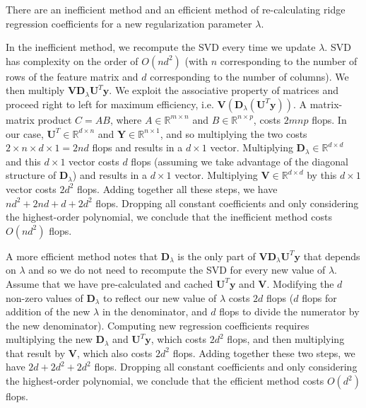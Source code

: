 \documentclass{article}
\begin{document}
There are an inefficient method and an efficient method of re-calculating ridge
regression coefficients for a new regularization parameter $\lambda$.

In the inefficient method, we recompute the SVD every
time we update $\lambda$. SVD has complexity on the order of
$O(nd^2)$ (with $n$ corresponding to the number of rows of the feature matrix and 
$d$ corresponding to the number of columns). We then multiply
$\mathbf{VD}_\lambda \mathbf{U}^T\mathbf{y}$. We exploit the associative
property of matrices and proceed right to left for maximum efficiency, 
i.e. $\mathbf{V}(\mathbf{D}_\lambda(\mathbf{U}^T\mathbf{y}))$.
A matrix-matrix product $C=AB$, where $A \in \mathbb{R}^{m \times n}$ and $B \in
\mathbb{R}^{n \times p}$, costs $2mnp$ flops. In our case, $\mathbf{U}^T \in
\mathbb{R}^{d \times n}$ and $\mathbf{Y} \in \mathbb{R}^{n \times 1}$, and so
multiplying the two costs $2 \times n \times d \times 1 = 2nd$ flops and results
in a $d \times 1$ vector. Multiplying $\mathbf{D}_\lambda \in \mathbb{R}^{d
\times d}$ and this $d \times 1$ vector costs $d$ flops (assuming we take advantage of the
diagonal structure of $\mathbf{D}_\lambda$) and results in a $d \times 1$ vector. 
Multiplying $\mathbf{V} \in \mathbb{R}^{d \times d}$ by this $d \times 1$ vector costs 
$2d^2$ flops. Adding together all these steps, we have $nd^2 + 2nd + d +
2d^2$ flops. Dropping all constant coefficients and only considering the
highest-order polynomial, we conclude that the inefficient method costs
$O(nd^2)$ flops.

A more efficient method notes that $\mathbf{D}_\lambda$ is the only part of 
$\mathbf{VD}_\lambda \mathbf{U}^T\mathbf{y}$ that depends on $\lambda$
and so we do not need to recompute the
SVD for every new value of $\lambda$. Assume that we have pre-calculated and
cached $\mathbf{U}^T\mathbf{y}$ and $\mathbf{V}$. Modifying the $d$ non-zero
values of $\mathbf{D}_\lambda$ to reflect our new value of $\lambda$ costs
$2d$ flops ($d$ flops for addition of the new $\lambda$ in the denominator, 
and $d$ flops to
divide the numerator by the new denominator). 
Computing new regression coefficients requires multiplying the new $\mathbf{D}_\lambda$ and
$\mathbf{U}^T\mathbf{y}$, which costs $2d^2$ flops, and then multiplying that
result by $\mathbf{V}$, which also costs $2d^2$ flops. Adding together these
two steps, we have $2d + 2d^2 + 2d^2$ flops. Dropping all constant coefficients and
only considering the highest-order polynomial, we conclude that the efficient method
costs $O(d^2)$ flops. 
\end{document}
